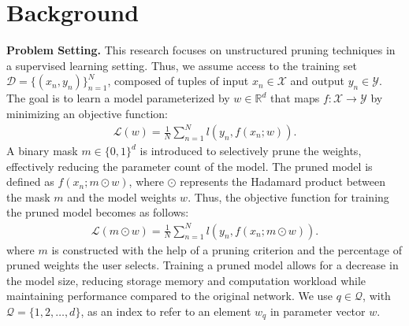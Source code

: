 \section{Background}

\textbf{Problem Setting.} This research focuses on unstructured pruning techniques in a supervised learning setting. Thus, we assume access to the training set $\mathcal{D} = \{(x_n, y_n)\}_{n=1}^N$, composed of tuples of input $x_n \in \mathcal{X}$ and output $y_n \in \mathcal{Y}$. The goal is to learn a model parameterized by $w \in \mathbb{R}^d$ that maps $f: \mathcal{X} \rightarrow \mathcal{Y}$ by minimizing an objective function:
\begin{align}
    \mathcal{L}(w) = \frac{1}{N} \sum_{n=1}^N l(y_n, f(x_n;w)).
    \label{eq:obj_func}
\end{align}
\newpage %
A binary mask $m \in \{0,1\}^d$ is introduced to selectively prune the weights, effectively reducing the parameter count of the model. The pruned model is defined as $f(x_n;m \odot w)$, where $\odot$ represents the Hadamard product between the mask $m$ and the model weights $w$. Thus, the objective function for training the pruned model becomes as follows:
\begin{align}
    \mathcal{L}(m \odot w) = \frac{1}{N} \sum_{n=1}^N l(y_n, f(x_n; m \odot w)).
    \label{eq:mask_obj_func}
\end{align}
where $m$ is constructed with the help of a pruning criterion and the percentage of pruned weights the user selects. Training a pruned model allows for a decrease in the model size, reducing storage memory and computation workload while maintaining performance compared to the original network. We use $q \in \mathcal{Q}$, with $\mathcal{Q} = \{1,2, \dots,d\}$, as an index to refer to an element $w_q$ in parameter vector $w$.


